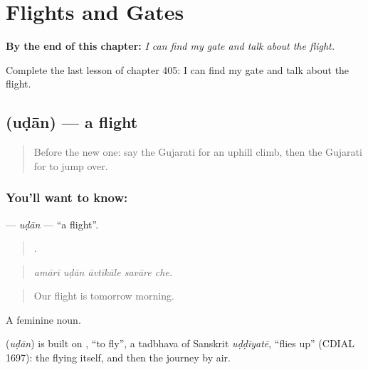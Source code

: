 
\chapter{Flights and Gates}
\label{ch:gu-flights-and-gates}

\begin{chapteropening}
\textbf{By the end of this chapter:} \emph{I can find my gate and talk about the flight.}

Complete the last lesson of chapter 405: I can find my gate and talk about the flight.
\end{chapteropening}

\section[\texorpdfstring{\gu{ઉડાન} (uḍān)}{ઉડાન (uḍān)}]{ (uḍān) — a flight}

\label{lesson:GU-C405-udan}



\begin{quote}
Before the new one: say the Gujarati for an uphill climb, then the Gujarati for to jump over.
\end{quote}

\subsection*{You'll want to know: }
\textbf{} — \emph{uḍān} — \textquotedblleft{}a flight\textquotedblright{}.

\begin{quote}
    .
\end{quote}

\begin{quote}
\emph{amārī uḍān āvtīkāle savāre che.}
\end{quote}

\begin{quote}
Our flight is tomorrow morning.
\end{quote}

A feminine noun.

\begin{cousinweb}
\textbf{} (\emph{uḍān}) is built on , \textquotedblleft{}to fly\textquotedblright{}, a tadbhava of Sanskrit \emph{uḍḍīyatē}, \textquotedblleft{}flies up\textquotedblright{} (CDIAL 1697): the flying itself, and then the journey by air.
\end{cousinweb}

